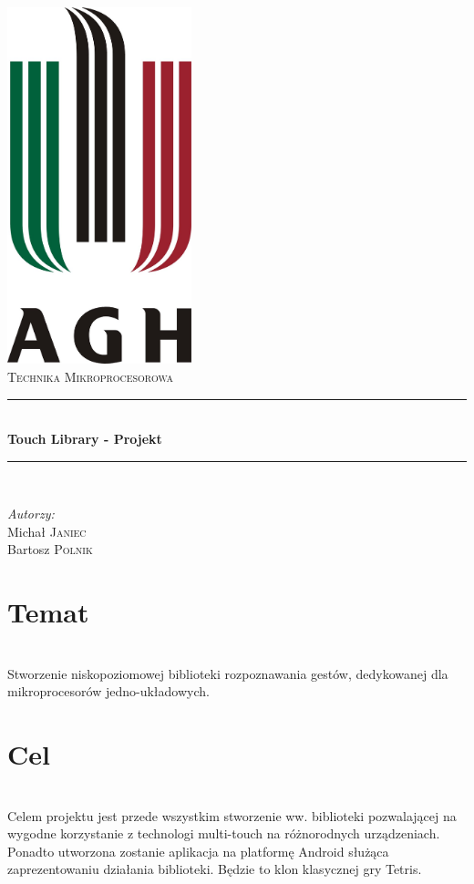 \documentclass[a4paper,12pt]{article}
\newcommand{\HRule}{\rule{\linewidth}{0.5mm}}
\begin{document}
\begin{titlepage}
	\begin{center}
		\includegraphics[width=0.4\textwidth]{Data/logo.jpg} \\[1cm]
		\textsc{\LARGE Technika Mikroprocesorowa} \\[0.8cm]
		\HRule \\[0.4cm]
		{ \huge \bfseries Touch Library - Projekt} \\[0.4cm]
		\HRule \\[1.5cm]
	\end{center}
	\begin{minipage}{0.4\textwidth}
		\begin{flushleft} \large
		\emph{Autorzy:} \\
		Michał \textsc{Janiec} \\
		Bartosz \textsc{Polnik}
		\end{flushleft}
	\end{minipage}
\end{titlepage}
\thispagestyle{empty}



\section{\Large Temat} \ \\[0.1cm]
\indent Stworzenie niskopoziomowej biblioteki rozpoznawania gestów, dedykowanej dla mikroprocesorów jedno-układowych.

\section{\Large Cel} \ \\[0.1cm]
\indent Celem projektu jest przede wszystkim stworzenie ww. biblioteki pozwalającej na wygodne korzystanie z technologi multi-touch na różnorodnych urządzeniach. Ponadto utworzona zostanie aplikacja na platformę Android służąca zaprezentowaniu działania biblioteki. Będzie to klon klasycznej gry Tetris.
\end{document}
